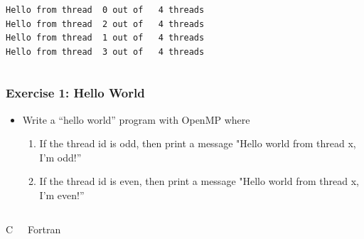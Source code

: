\documentclass[10pt,t]{beamer}
\begin{document}
{\begin{frame}[fragile]
\begin{columns}
\begin{itemize}
    \end{itemize}
  \end{columns}
  \begin{columns}
    \column{8cm}
    \begin{exampleblock}{}
      \begin{Verbatim}
Hello from thread  0 out of   4 threads
Hello from thread  2 out of   4 threads
Hello from thread  1 out of   4 threads
Hello from thread  3 out of   4 threads
      \end{Verbatim}
    \end{exampleblock}
  \end{columns}
\end{frame}
}
\footnotesize

\begin{frame}[fragile]
  \frametitle{Exercise 1: Hello World}
  \begin{itemize}
    \item Write a ``hello world'' program with OpenMP where
      \begin{enumerate}
        \item If the thread id is odd, then print a message "Hello world from thread x, I'm odd!''
        \item If the thread id is even, then print a message "Hello world from thread x, I'm even!''
      \end{enumerate}
  \end{itemize}
  \begin{columns}
    \begin{block}{C}
      
    \end{block}
    \begin{block}{Fortran}
      
    \end{block}
  \end{columns}
\end{frame}
\end{document}
